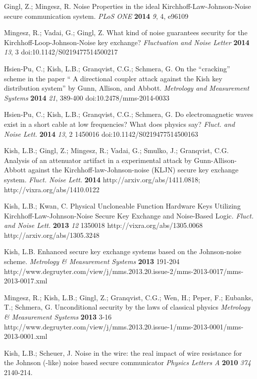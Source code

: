 \documentclass[a4paper,12pt,pdftex]{article}
\begin{document}
\begin{thebibliography}{99}
Gingl, Z.; Mingesz, R. Noise Properties in the ideal Kirchhoff-Law-Johnson-Noise secure communication system. {\em PLoS ONE} {\bf 2014} {\em 9}, 4, e96109

Mingesz, R.; Vadai, G.; Gingl, Z. What kind of noise guarantees security for the Kirchhoff-Loop-Johnson-Noise key exchange? {\em Fluctuation and Noise Letter} {\bf 2014} {\em 13}, 3 doi:10.1142/S0219477514500217

Hsien-Pu, C.; Kish, L.B.; Granqvist, C.G.; Schmera, G. On the ``cracking'' scheme in the paper `` A directional coupler attack against the Kish key distribution system'' by Gunn, Allison, and Abbott. {\em Metrology and Measurement Systems} {\bf 2014} {\em 21}, 389-400 doi:10.2478/mms-2014-0033

Hsien-Pu, C.; Kish, L.B.; Granqvist, C.G.; Schmera, G. Do electromagnetic waves exist in a short cable at low frequencies? What does physics say? {\em Fluct. and Noise Lett.} {\bf 2014} {\em 13}, 2 1450016 doi:10.1142/S0219477514500163

Kish, L.B.; Gingl, Z.; Mingesz, R.; Vadai, G.; Smulko, J.; Granqvist, C.G. Analysis of an attenuator artifact in a experimental attack by Gunn-Allison-Abbott against the Kirchhoff-law-Johnson-noise (KLJN) secure key exchange system. {\em Fluct. Noise Lett.} {\bf 2014} http://arxiv.org/abs/1411.0818; http://vixra.org/abs/1410.0122


Kish, L.B.; Kwan, C. Physical Uncloneable Function Hardware Keys Utilizing Kirchhoff-Law-Johnson-Noise Secure Key Exchange and Noise-Based Logic. {\em Fluct. and Noise Lett.} {\bf 2013} {\em 12} 1350018 http://vixra.org/abs/1305.0068 http://arxiv.org/abs/1305.3248


Kish, L.B. Enhanced secure key exchange systems based on the Johnson-noise scheme. {\em Metrology \& Measurement Systems} {\bf 2013} 191-204 http://www.degruyter.com/view/j/mms.2013.20.issue-2/mms-2013-0017/mms-2013-0017.xml

Mingesz, R.; Kish, L.B.; Gingl, Z.; Granqvist, C.G.; Wen, H.; Peper, F.; Eubanks, T.; Schmera, G. Unconditional security by the laws of classical physics {\em Metrology \& Measurement Systems} {\bf 2013} 3-16 http://www.degruyter.com/view/j/mms.2013.20.issue-1/mms-2013-0001/mms-2013-0001.xml

Kish, L.B.; Scheuer, J. Noise in the wire: the real impact of wire resistance for the Johnson (-like) noise based secure communicator {\em Physics Letters A} {\bf 2010} {\em 374} 2140-214.


\end{thebibliography}
\end{document}

